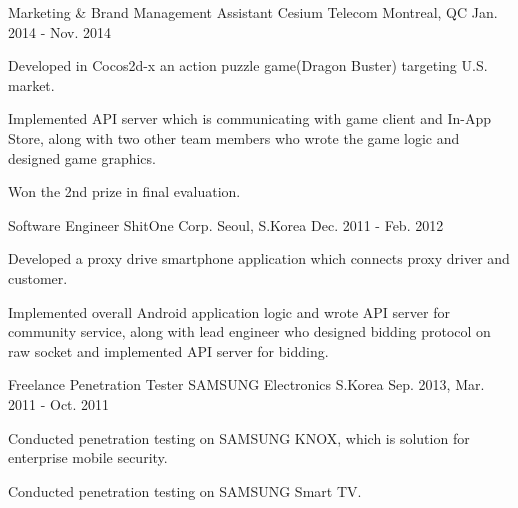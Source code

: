 \begin{cventries}
  \cventry
    {Marketing & Brand Management Assistant} %
    {Cesium Telecom} %
    {Montreal, QC} %
    {Jan. 2014 - Nov. 2014} %
    {
      \begin{cvitems} %
        \item {Developed in Cocos2d-x an action puzzle game(Dragon Buster) targeting U.S. market.}
        \item {Implemented API server which is communicating with game client and In-App Store, along with two other team members who wrote the game logic and designed game graphics.}
        \item {Won the 2nd prize in final evaluation.}
      \end{cvitems}
    }

  \cventry
    {Software Engineer} %
    {ShitOne Corp.} %
    {Seoul, S.Korea} %
    {Dec. 2011 - Feb. 2012} %
    {
      \begin{cvitems} %
        \item {Developed a proxy drive smartphone application which connects proxy driver and customer.}
        \item {Implemented overall Android application logic and wrote API server for community service, along with lead engineer who designed bidding protocol on raw socket and implemented API server for bidding.}
      \end{cvitems}
    }

  \cventry
    {Freelance Penetration Tester} %
    {SAMSUNG Electronics} %
    {S.Korea} %
    {Sep. 2013, Mar. 2011 - Oct. 2011} %
    {
      \begin{cvitems} %
        \item {Conducted penetration testing on SAMSUNG KNOX, which is solution for enterprise mobile security.}
        \item {Conducted penetration testing on SAMSUNG Smart TV.}
      \end{cvitems}
    }

\end{cventries}
